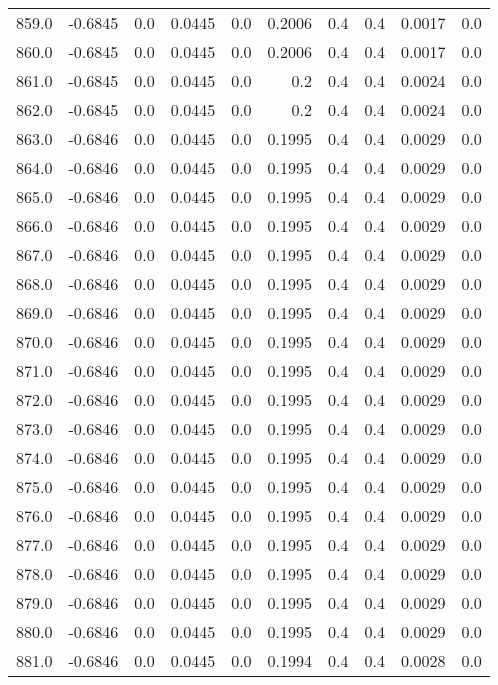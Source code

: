 \begin{longtable}{lrrrrrrrrr}
859.0 & -0.6845 & 0.0 & 0.0445 & 0.0 & 0.2006 & 0.4 & 0.4 & 0.0017 & 0.0 \\
860.0 & -0.6845 & 0.0 & 0.0445 & 0.0 & 0.2006 & 0.4 & 0.4 & 0.0017 & 0.0 \\
861.0 & -0.6845 & 0.0 & 0.0445 & 0.0 & 0.2 & 0.4 & 0.4 & 0.0024 & 0.0 \\
862.0 & -0.6845 & 0.0 & 0.0445 & 0.0 & 0.2 & 0.4 & 0.4 & 0.0024 & 0.0 \\
863.0 & -0.6846 & 0.0 & 0.0445 & 0.0 & 0.1995 & 0.4 & 0.4 & 0.0029 & 0.0 \\
864.0 & -0.6846 & 0.0 & 0.0445 & 0.0 & 0.1995 & 0.4 & 0.4 & 0.0029 & 0.0 \\
865.0 & -0.6846 & 0.0 & 0.0445 & 0.0 & 0.1995 & 0.4 & 0.4 & 0.0029 & 0.0 \\
866.0 & -0.6846 & 0.0 & 0.0445 & 0.0 & 0.1995 & 0.4 & 0.4 & 0.0029 & 0.0 \\
867.0 & -0.6846 & 0.0 & 0.0445 & 0.0 & 0.1995 & 0.4 & 0.4 & 0.0029 & 0.0 \\
868.0 & -0.6846 & 0.0 & 0.0445 & 0.0 & 0.1995 & 0.4 & 0.4 & 0.0029 & 0.0 \\
869.0 & -0.6846 & 0.0 & 0.0445 & 0.0 & 0.1995 & 0.4 & 0.4 & 0.0029 & 0.0 \\
870.0 & -0.6846 & 0.0 & 0.0445 & 0.0 & 0.1995 & 0.4 & 0.4 & 0.0029 & 0.0 \\
871.0 & -0.6846 & 0.0 & 0.0445 & 0.0 & 0.1995 & 0.4 & 0.4 & 0.0029 & 0.0 \\
872.0 & -0.6846 & 0.0 & 0.0445 & 0.0 & 0.1995 & 0.4 & 0.4 & 0.0029 & 0.0 \\
873.0 & -0.6846 & 0.0 & 0.0445 & 0.0 & 0.1995 & 0.4 & 0.4 & 0.0029 & 0.0 \\
874.0 & -0.6846 & 0.0 & 0.0445 & 0.0 & 0.1995 & 0.4 & 0.4 & 0.0029 & 0.0 \\
875.0 & -0.6846 & 0.0 & 0.0445 & 0.0 & 0.1995 & 0.4 & 0.4 & 0.0029 & 0.0 \\
876.0 & -0.6846 & 0.0 & 0.0445 & 0.0 & 0.1995 & 0.4 & 0.4 & 0.0029 & 0.0 \\
877.0 & -0.6846 & 0.0 & 0.0445 & 0.0 & 0.1995 & 0.4 & 0.4 & 0.0029 & 0.0 \\
878.0 & -0.6846 & 0.0 & 0.0445 & 0.0 & 0.1995 & 0.4 & 0.4 & 0.0029 & 0.0 \\
879.0 & -0.6846 & 0.0 & 0.0445 & 0.0 & 0.1995 & 0.4 & 0.4 & 0.0029 & 0.0 \\
880.0 & -0.6846 & 0.0 & 0.0445 & 0.0 & 0.1995 & 0.4 & 0.4 & 0.0029 & 0.0 \\
881.0 & -0.6846 & 0.0 & 0.0445 & 0.0 & 0.1994 & 0.4 & 0.4 & 0.0028 & 0.0 \\

\end{longtable}
